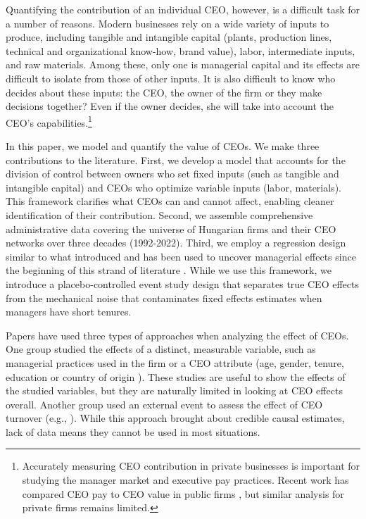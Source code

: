 \documentclass[11pt,a4paper]{article}
\begin{document}
Quantifying the contribution of an individual CEO, however, is a difficult task for a number of reasons. Modern businesses rely on a wide variety of inputs to produce, including tangible and intangible capital (plants, production lines, technical and organizational know-how, brand value), labor, intermediate inputs, and raw materials. Among these, only one is managerial capital and its effects are difficult to isolate from those of other inputs. It is also difficult to know who decides about these inputs: the CEO, the owner of the firm or they make decisions together? Even if the owner decides, she will take into account the CEO's capabilities.\footnote{Accurately measuring CEO contribution in private businesses is important for studying the manager market and executive pay practices. Recent work has compared CEO pay to CEO value in public firms \citep{tervio2008difference,gabaix2008ceo}, but similar analysis for private firms remains limited.} 

In this paper, we model and quantify the value of CEOs. We make three contributions to the literature. First, we develop a model that accounts for the division of control between owners who set fixed inputs (such as tangible and intangible capital) and CEOs who optimize variable inputs (labor, materials). This framework clarifies what CEOs can and cannot affect, enabling cleaner identification of their contribution. Second, we assemble comprehensive administrative data covering the universe of Hungarian firms and their CEO networks over three decades (1992-2022). Third, we employ a regression design similar to what \cite{abowd1999high} introduced and has been used to uncover managerial effects since the beginning of this strand of literature \citep{Bertrand2003-io}. While we use this framework, we introduce a placebo-controlled event study design that separates true CEO effects from the mechanical noise that contaminates fixed effects estimates when managers have short tenures.

Papers have used three types of approaches when analyzing the effect of CEOs. One group studied the effects of a distinct, measurable variable, such as managerial practices used in the firm \citep{} or a CEO attribute (age, gender, tenure, education or country of origin \citep{}). These studies are useful to show the effects of the studied variables, but they are naturally limited in looking at CEO effects overall. Another group used an external event to assess the effect of CEO turnover (e.g., \citet{bennedsen2020ceos}). While this approach brought about credible causal estimates, lack of data means they cannot be used in most situations. 
\end{document}
